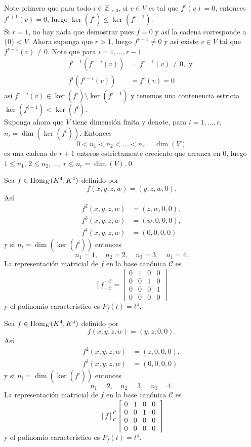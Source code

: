 \dem Note primero que para todo $i\in\mathbb{Z}_{>0}$, si $v\in V$ es tal que $f^i(v)=0$, entonces $f^{i+1}(v)=0$, luego $\ker(f^i)\le\ker(f^{i+1})$.\\
Si $r=1$, no hay nada que demostrar pues $f=0$ y as\'i la cadena corresponde a $\{0\}<V$. Ahora suponga que $r>1$, luego $f^{r-1}\ne 0$ y as\'i existe $v\in V$ tal que $f^{r-1}(v)\ne 0$. Note que para $i=1,\ldots,r-1$
\begin{align*}
f^{i-1}\left(f^{r-i}(v)\right) & =f^{r-1}(v)\ne 0,\textrm{ y }\\
  f^i\left(f^{r-i}(v)\right) & =f^r(v)=0
\end{align*}
as\'i $f^{r-i}(v)\in \ker(f^i)\setminus \ker(f^{i-1})$ y tenemos una contenencia estricta $\ker(f^{i-1})<\ker(f^i)$.\\
Suponga ahora que $V$ tiene dimensi\'on finita y denote, para $i=1,\ldots,r$, $n_i=\dim(\ker(f^i))$. Entonces
\[
0<n_1<n_2<\ldots<n_r=\dim(V)
\]
es una cadena de $r+1$ enteros estrictamente creciente que arranca en $0$, luego $1\le n_1$, $2\le n_2$, $\ldots$, $r\le n_r=\dim(V)$.\qed

\begin{ejem}\label{ejnil1}
Sea $f\in\operatorname{Hom}_K(K^4,K^4)$ definido por
$$f(x,y,z,w)=(y,z,w,0).$$
As\'i
\begin{align*}
f^2(x,y,z,w) & = (z,w,0,0),\\
f^3(x,y,z,w) & = (w,0,0,0),\\
f^4(x,y,z,w) & = (0,0,0,0)
\end{align*}
y si $n_i=\dim(\ker(f^i))$ entonces
$$n_1=1,\quad n_2=2,\quad n_3=3,\quad n_4=4.$$
La representaci\'on matricial de $f$ en la base can\'onica $\mathcal{C}$ es
$$
\left[f\right]^{\mathcal{C}}_{\mathcal{C}}=\left[\begin{array}{rrrr}
0 & 1 & 0 & 0\\
0 & 0 & 1 & 0\\
0 & 0 & 0 & 1\\
0 & 0 & 0 & 0
\end{array}\right]
$$
y el polinomio caracter\'istico es $P_f(t)=t^4$.
\end{ejem}

\begin{ejem}\label{ejnil2}
Sea $f\in\operatorname{Hom}_K(K^4,K^4)$ definido por
$$f(x,y,z,w)=(y,z,0,0).$$
As\'i
\begin{align*}
f^2(x,y,z,w) & = (z,0,0,0),\\
f^3(x,y,z,w) & = (0,0,0,0)
\end{align*}
y si $n_i=\dim(\ker(f^i))$ entonces
$$n_1=2,\quad n_2=3,\quad n_3=4.$$
La representaci\'on matricial de $f$ en la base can\'onica $\mathcal{C}$ es
$$
\left[f\right]^{\mathcal{C}}_{\mathcal{C}}\left[\begin{array}{rrr|r}
0 & 1 & 0 & 0\\
0 & 0 & 1 & 0\\
0 & 0 & 0 & 0\\
\hline
0 & 0 & 0 & 0
\end{array}\right]
$$
y el polinomio caracter\'istico es $P_f(t)=t^4$.
\end{ejem}

